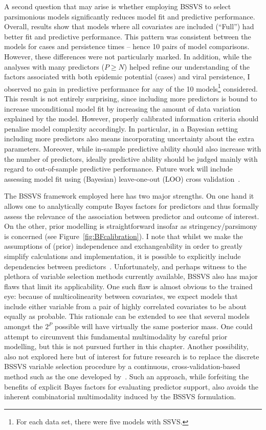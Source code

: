A second question that may arise is whether employing BSSVS to select parsimonious models significantly reduces model fit and predictive performance.
Overall, results show that models where all covariates are included (``Full'') had better fit and predictive performance.
This pattern was consistent between the models for cases and persistence times -- hence 10 pairs of model comparisons.
However, these differences were not particularly marked.
In addition, while the analyses with many predictors ($P \geq N$) helped refine our understanding of the factors associated with both epidemic potential (cases) and viral persistence, I observed no gain in predictive performance for any of the 10 models\footnote{For each data set, there were five models with SSVS.} considered.
This result is not entirely surprising, since including more predictors is bound to increase unconditional model fit by increasing the amount of data variation explained by the model.
However, properly calibrated information criteria should penalise model complexity accordingly.
In particular, in a Bayesian setting including more predictors also means incorporating uncertainty about the extra parameters.
Moreover, while in-sample predictive ability should also increase with the number of predictors, ideally predictive ability should be judged mainly with regard to out-of-sample predictive performance.
Future work will include assessing model fit using (Bayesian) leave-one-out (LOO) cross validation~\citep{Vehtari2017}.

The BSSVS framework employed here has two major strengths.
On one hand it allows one to analytically compute Bayes factors for predictors and thus formally assess the relevance of the association between predictor and outcome of interest.
On the other, prior modelling is straightforward insofar as stringency/parsimony is concerned (see Figure~\ref{fig:BFcalibration}).
I note that whilst we make the assumptions of (prior) independence and exchangeability  in order to greatly simplify calculations and implementation, it is possible to explicitly include dependencies between predictors~\citep{Chipman1996}.
Unfortunately, and perhaps witness to the plethora of variable selection methods currently available, BSSVS also has major flaws that limit its applicability.
One such flaw is almost obvious to the trained  eye: because of multicolinearity between covariates, we expect models that include either variable from a pair of highly correlated covariates to be about equally as probable.
This rationale can be extended to see that several models amongst the $2^P$ possible will have virtually the same posterior mass. 
One could attempt to circumvent this fundamental multimodality by careful prior modelling, but this is not pursued further in this chapter.
Another possibility, also not explored here but of interest for future research is to replace the discrete BSSVS variable selection procedure by a continuous, cross-validation-based method such as the one developed by~\cite{Piironen2017}.
Such an approach, while forfeiting the benefits of explicit Bayes factors for evaluating predictor support, also avoids the inherent combinatorial multimodality induced by the BSSVS formulation.

